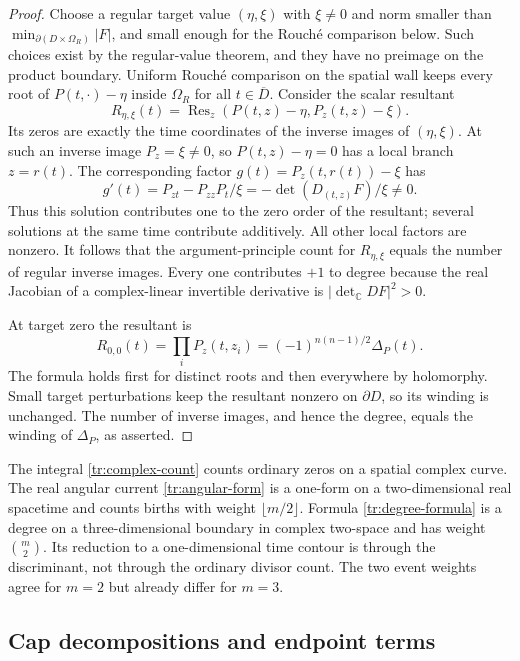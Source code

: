 \begin{proof}
Choose a regular target value $(\eta,\xi)$ with $\xi\ne0$ and norm
smaller than $\min_{\partial(D\times\Omega_R)}|F|$, and small enough
for the Rouch\'e comparison below.  Such choices exist by the regular-value theorem, and they
have no preimage on the product boundary.  Uniform Rouch\'e comparison
on the spatial wall keeps every root of $P(t,\cdot)-\eta$ inside
$\Omega_R$ for all $t\in\overline D$.  Consider the scalar resultant
\[
 R_{\eta,\xi}(t)=\operatorname{Res}_z(P(t,z)-\eta,P_z(t,z)-\xi).
\]
Its zeros are exactly the time coordinates of the inverse images of
$(\eta,\xi)$.  At such an inverse image $P_z=\xi\ne0$, so
$P(t,z)-\eta=0$ has a local branch $z=r(t)$.  The corresponding factor
$g(t)=P_z(t,r(t))-\xi$ has
\[
 g'(t)=P_{zt}-P_{zz}P_t/\xi
           =-\det(D_{(t,z)}F)/\xi\ne0.
\]
Thus this solution contributes one to the zero order of the resultant;
several solutions at the same time contribute additively.  All other
local factors are nonzero.  It follows that the argument-principle
count for $R_{\eta,\xi}$ equals the number of regular inverse images.
Every one contributes $+1$ to degree because the real Jacobian of a
complex-linear invertible derivative is
$|\det_{\mathbb C}DF|^2>0$.

At target zero the resultant is
\[
 R_{0,0}(t)=\prod_iP_z(t,z_i)
          =(-1)^{n(n-1)/2}\Delta_P(t).
\]
The formula holds first for distinct roots and then everywhere by
holomorphy.  Small target perturbations keep the resultant nonzero on
$\partial D$, so its winding is unchanged.  The number of inverse
images, and hence the degree, equals the winding of $\Delta_P$, as
asserted.
\end{proof}

\begin{remark}\label{tr:distinct-charges}
The integral \eqref{tr:complex-count} counts ordinary zeros on a spatial
complex curve.  The real angular current \eqref{tr:angular-form} is a
one-form on a two-dimensional real spacetime and counts births with
weight $\lfloor m/2\rfloor$.  Formula \eqref{tr:degree-formula} is a
degree on a three-dimensional boundary in complex two-space and has
weight $\binom m2$.  Its reduction to a one-dimensional time contour is
through the discriminant, not through the ordinary divisor count.
The two event weights agree for $m=2$ but already differ for $m=3$.
\end{remark}

\subsection{Cap decompositions and endpoint terms}

